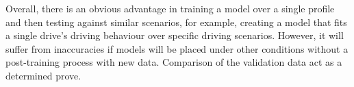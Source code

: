 %
%
Overall, there is an obvious advantage in training a model over a single profile and then testing against similar scenarios, for example, creating a model that fits a single drive's driving behaviour over specific driving scenarios.
However, it will suffer from inaccuracies if models will be placed under other conditions without a post-training process with new data.
Comparison of the validation data act as a determined prove.